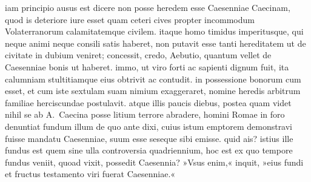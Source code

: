 iam principio ausus est dicere non posse heredem esse Caesenniae Caecinam, quod is deteriore iure esset quam ceteri cives propter incommodum Volaterranorum calamitatemque civilem. itaque homo timidus imperitusque, qui neque animi neque consili satis haberet, non putavit esse tanti hereditatem ut de civitate in dubium veniret; concessit, credo, Aebutio, quantum vellet de Caesenniae bonis ut haberet. immo, ut viro forti ac sapienti dignum fuit, ita calumniam stultitiamque eius obtrivit ac contudit.  in possessione bonorum cum esset, et cum iste sextulam suam nimium exaggeraret, nomine heredis arbitrum familiae herciscundae postulavit. atque illis paucis diebus, postea quam videt nihil se ab A.~Caecina posse litium terrore abradere, homini Romae in foro denuntiat fundum illum de quo ante dixi, cuius istum emptorem demonstravi fuisse mandatu Caesenniae, suum esse seseque sibi emisse. quid ais? istius ille fundus est quem sine ulla controversia quadriennium, hoc est ex quo tempore fundus veniit, quoad vixit, possedit Caesennia? »Vsus enim,« inquit, »eius fundi et fructus testamento viri fuerat Caesenniae.«

